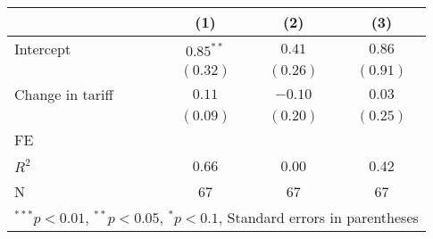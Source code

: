 
\begin{tabular}{l c c c }
\hline
 & (1) & (2) & (3) \\
\hline
Intercept & $0.85^{**}$ & $0.41$   & $0.86$   \\
            & $(0.32)$    & $(0.26)$ & $(0.91)$ \\
Change in tariff     & $0.11$      & $-0.10$  & $0.03$   \\
            & $(0.09)$    & $(0.20)$ & $(0.25)$ \\
\hline
FE          &                &                &                \\ 
\hline
$R^2$       & 0.66        & 0.00     & 0.42     \\
N           & 67          & 67       & 67       \\
\hline
\multicolumn{4}{l}{\scriptsize{$^{***}p<0.01$, $^{**}p<0.05$, $^*p<0.1$, Standard errors in parentheses}}
\end{tabular}

